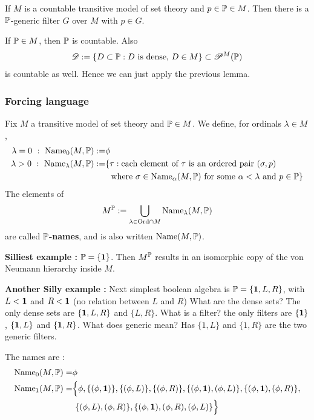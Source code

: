 \documentclass[12pt,a4paper]{article}
\newenvironment{proof}
{\begin{changemargin}{0.5cm}{0.5cm} 
	}%
	{\end{changemargin}
}
\newenvironment{p}
{\begin{proof} 
	}%
	{\end{proof}
}
\begin{document}
\corr If $M$ is a countable transitive model of set theory and $p\in \mathbb{P} \in M$. Then there is a $\mathbb{P}$-generic filter $G$ over $M$ with $p\in G$.
\begin{p}
\pf If $\mathbb{P} \in M$, then $\mathbb{P}$ is countable. Also
\begin{align*}
\mathscr{D} := \{D\subset \mathbb{P} : D \text{ is dense, } D\in M \} \subset \mathscr{P}^M(\mathbb{P})
\end{align*}
is countable as well. Hence we can just apply the previous lemma.

\eop
\end{p}
\s

\subsubsection*{Forcing language}

Fix $M$ a transitive model of set theory and $\mathbb{P} \in M$. We define, for ordinals $\lambda \in M$,
\begin{align*}
\lambda = 0 \,\, : \,\, \text{Name}_0 (M, \mathbb{P}) := & \phi \\
\lambda >0 \,\, : \,\, \text{Name}_{\lambda}(M, \mathbb{P}) := & \{\tau : \text{each element of }\tau \text{ is an ordered pair } (\sigma, p) \\
& \,\, \text{ where } \sigma\in \text{Name}_{\alpha}(M, \mathbb{P}) \text{ for some } \alpha < \lambda \text{ and } p\in \mathbb{P} \}
\end{align*}
The elements of
\begin{align*}
M^{\mathbb{P}} := \bigcup_{\lambda \in \text{Ord} \cap M} \text{Name}_{\lambda}(M, \mathbb{P})
\end{align*}
are called \textbf{$\mathbb{P}$-names}, and is also written $\text{Name}(M, \mathbb{P})$.
\s

\textbf{Silliest example :} $\mathbb{P} = \{\bm{1}\}$. Then $M^{\mathbb{P}}$ results in an isomorphic copy of the von Neumann hierarchy inside $M$.
\s

\textbf{Another Silly example :} Next simplest boolean algebra is $\mathbb{P} = \{\bm{1}, L, R \}$, with $L< \bm{1}$ and $R< \bm{1}$ (no relation between $L$ and $R$) What are the dense sets? The only dense sets are $\{\bm{1}, L, R\}$ and $\{L, R\}$. What is a filter? the only filters are $\{\bm{1}\}$, $\{\bm{1}, L \}$ and $\{\bm{1}, R\}$. What does generic mean? Has $\{1, L \}$ and $\{1, R\}$ are the two generic filters.

\quad The names are :
\begin{align*}
\text{Name}_0 (M, \mathbb{P}) =& \phi\\ 
\text{Name}_1 (M, \mathbb{P}) =& \Big\{ \phi,  \{(\phi, \bm{1}) \}, \{(\phi, L) \}, \{(\phi, R) \}, \{(\phi, \bm{1}), (\phi, L)\}, \{(\phi, \bm{1}), (\phi, R)\},\\
& \,\, \{(\phi, L), (\phi, R)\}, \{(\phi, \bm{1}), (\phi, R), (\phi, L)\} \Big\}
\end{align*}
\s
\end{document}
